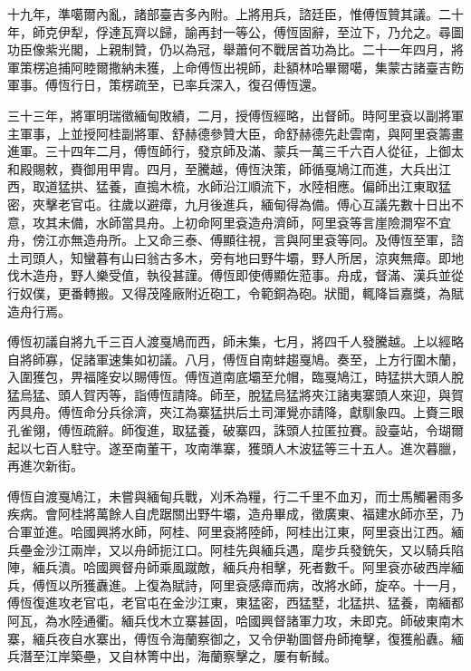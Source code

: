 \begin{pinyinscope}
十九年，準噶爾內亂，諸部臺吉多內附。上將用兵，諮廷臣，惟傅恆贊其議。二十年，師克伊犁，俘達瓦齊以歸，諭再封一等公，傅恆固辭，至泣下，乃允之。尋圖功臣像紫光閣，上親制贊，仍以為冠，舉蕭何不戰居首功為比。二十一年四月，將軍策楞追捕阿睦爾撒納未獲，上命傅恆出視師，赴額林哈畢爾噶，集蒙古諸臺吉飭軍事。傅恆行日，策楞疏至，已率兵深入，復召傅恆還。

三十三年，將軍明瑞徵緬甸敗績，二月，授傅恆經略，出督師。時阿里袞以副將軍主軍事，上並授阿桂副將軍、舒赫德參贊大臣，命舒赫德先赴雲南，與阿里袞籌畫進軍。三十四年二月，傅恆師行，發京師及滿、蒙兵一萬三千六百人從征，上御太和殿賜敕，賚御用甲胄。四月，至騰越，傅恆決策，師循戛鳩江而進，大兵出江西，取道猛拱、猛養，直搗木梳，水師沿江順流下，水陸相應。偏師出江東取猛密，夾擊老官屯。往歲以避瘴，九月後進兵，緬甸得為備。傅心互議先數十日出不意，攻其未備，水師當具舟。上初命阿里袞造舟濟師，阿里袞等言崖險澗窄不宜舟，傍江亦無造舟所。上又命三泰、傅顯往視，言與阿里袞等同。及傅恆至軍，諮土司頭人，知蠻暮有山曰翁古多木，旁有地曰野牛壩，野人所居，涼爽無瘴。即地伐木造舟，野人樂受值，執役甚謹。傅恆即使傅顯佐蒞事。舟成，督滿、漢兵並從行奴僕，更番轉搬。又得茂隆廠附近砲工，令範銅為砲。狀聞，輒降旨嘉獎，為賦造舟行焉。

傅恆初議自將九千三百人渡戛鳩而西，師未集，七月，將四千人發騰越。上以經略自將師寡，促諸軍速集如初議。八月，傅恆自南蚌趨戛鳩。奏至，上方行圍木蘭，入圍獲包，畀福隆安以賜傅恆。傅恆道南底壩至允帽，臨戛鳩江，時猛拱大頭人脫猛烏猛、頭人賀丙等，詣傅恆請降。師至，脫猛烏猛將夾江諸夷寨頭人來迎，與賀丙具舟。傅恆命分兵徐濟，夾江為寨猛拱后土司渾覺亦請降，獻馴象四。上賚三眼孔雀翎，傅恆疏辭。師復進，取猛養，破寨四，誅頭人拉匿拉賽。設臺站，令瑚爾起以七百人駐守。遂至南董干，攻南準寨，獲頭人木波猛等三十五人。進次暮臘，再進次新街。

傅恆自渡戛鳩江，未嘗與緬甸兵戰，刈禾為糧，行二千里不血刃，而士馬觸暑雨多疾病。會阿桂將萬餘人自虎踞關出野牛壩，造舟畢成，徵廣東、福建水師亦至，乃合軍並進。哈國興將水師，阿桂、阿里袞將陸師，阿桂出江東，阿里袞出江西。緬兵壘金沙江兩岸，又以舟師扼江口。阿桂先與緬兵遇，麾步兵發銃矢，又以騎兵陷陣，緬兵潰。哈國興督舟師乘風蹴敵，緬兵舟相擊，死者數千。阿里袞亦破西岸緬兵，傅恆以所獲纛進。上復為賦詩，阿里袞感瘴而病，改將水師，旋卒。十一月，傅恆復進攻老官屯，老官屯在金沙江東，東猛密，西猛墅，北猛拱、猛養，南緬都阿瓦，為水陸通衢。緬兵伐木立寨甚固，哈國興督諸軍力攻，未即克。師破東南木寨，緬兵夜自水寨出，傅恆令海蘭察御之，又令伊勒圖督舟師掩擊，復獲船纛。緬兵潛至江岸築壘，又自林箐中出，海蘭察擊之，屢有斬馘。


\end{pinyinscope}
